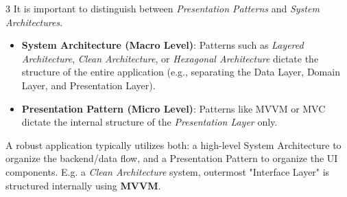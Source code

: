 \documentclass[a4paper, 9pt, landscape]{extarticle}
\begin{document}
\begin{multicols*}{3}
It is important to distinguish between \textit{Presentation Patterns} and \textit{System Architectures}.

\begin{itemize}
    \item \textbf{System Architecture (Macro Level)}: Patterns such as \textit{Layered Architecture}, \textit{Clean Architecture}, or \textit{Hexagonal Architecture} dictate the structure of the entire application (e.g., separating the Data Layer, Domain Layer, and Presentation Layer).
    \item \textbf{Presentation Pattern (Micro Level)}: Patterns like MVVM or MVC dictate the internal structure of the \textit{Presentation Layer} only.
\end{itemize}

A robust application typically utilizes both: a high-level System Architecture to organize the backend/data flow, and a Presentation Pattern to organize the UI components. E.g. a \textit{Clean Architecture} system,  outermost "Interface Layer" is structured internally using \textbf{MVVM}.


\end{multicols*}
\end{document}
